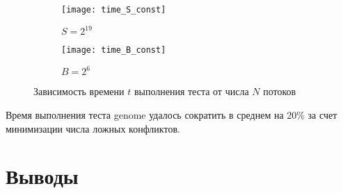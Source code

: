 \begin{figure}
\centering
\begin{subfigure}{0.5\textwidth}
  \centering
  \texttt{[image: time\_S\_const]}
  \caption{$S = 2^{19}$}
  \label{time_S_const}
\end{subfigure}%
\begin{subfigure}{0.5\textwidth}
  \centering
  \texttt{[image: time\_B\_const]}
  \caption{$B = 2^6$}
  \label{time_B_const}
\end{subfigure}
\caption{Зависимость времени $t$ выполнения теста от числа $N$ потоков}
\label{time_N}
\end{figure}

Время выполнения теста genome удалось сократить в среднем на 20\% за счет минимизации числа ложных конфликтов.

\section{Выводы}










\clearpage


